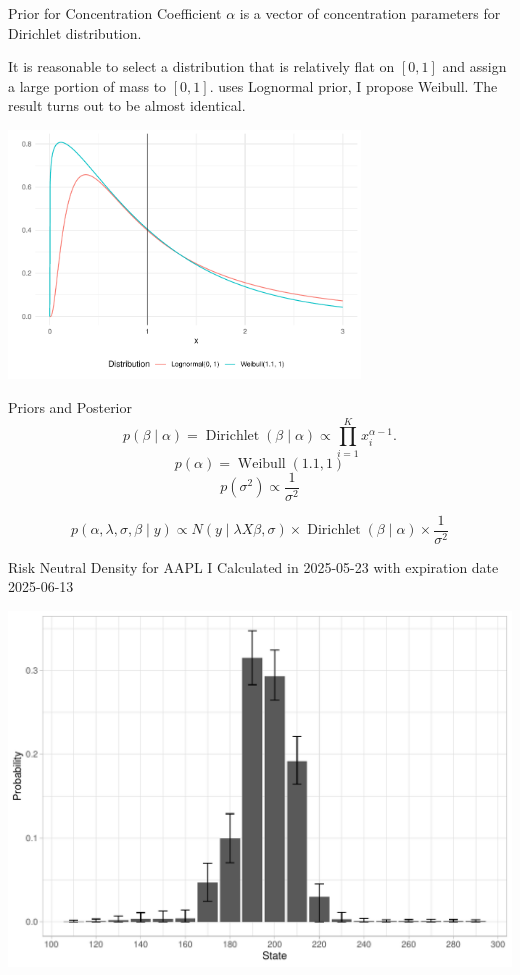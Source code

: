 \documentclass[10pt,aspectratio=43]{beamer}
\begin{document}
\begin{frame}{Prior for Concentration Coefficient}
    $\alpha$ is a vector of concentration parameters for Dirichlet distribution. 
    
    It is reasonable to select a distribution that is relatively flat on $[0,1]$ and assign a large portion of mass to $[0,1]$. \cite{fisherSimplexRegression2016} uses Lognormal prior, I propose Weibull. The result turns out to be almost identical.

    \includegraphics[width=0.7\textwidth]{prior_difference.pdf}

\end{frame}

\begin{frame}{Priors and Posterior}
     \[p(\beta\mid \alpha)=\operatorname{Dirichlet}(\beta\mid \alpha)\propto \prod_{i=1}^{K}x_{i}^{\alpha-1}.\]
    \[p(\alpha)=\operatorname{Weibull}(1.1,1)\]
    \[p(\sigma^2)\propto \frac{1}{\sigma^2}\]

    \[p(\alpha,\lambda,\sigma,\beta\mid y)\propto N(y\mid \lambda X\beta,\sigma)\times\operatorname{Dirichlet}(\beta\mid \alpha)\times \frac{1}{\sigma^2}\]

\end{frame}





\begin{frame}{Risk Neutral Density for AAPL I}
    Calculated in 2025-05-23 with expiration date 2025-06-13
    \begin{center}
        \includegraphics[width=0.8\linewidth]{betas_23_1.pdf}
    \end{center}
    
\end{frame}
\end{document}
